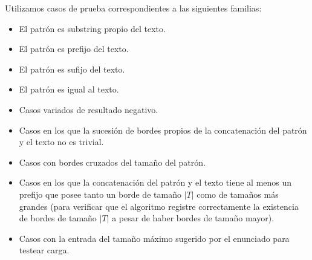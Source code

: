 Utilizamos casos de prueba correspondientes a las siguientes familias:
\begin{itemize}
\item El patrón es substring propio del texto.
\item El patrón es prefijo del texto.
\item El patrón es sufijo del texto.
\item El patrón es igual al texto.
\item Casos variados de resultado negativo.
\item Casos en los que la sucesión de bordes propios de la concatenación del patrón y el texto no es trivial.
\item Casos con bordes cruzados del tamaño del patrón.
\item Casos en los que la concatenación del patrón y el texto tiene al menos un prefijo que posee tanto un borde de tamaño $|T|$ como de tamaños más grandes (para verificar que el algoritmo registre correctamente la existencia de bordes de tamaño $|T|$ a pesar de haber bordes de tamaño mayor).
\item Casos con la entrada del tamaño máximo sugerido por el enunciado para testear carga.
\end{itemize}


